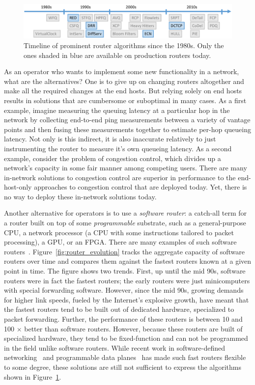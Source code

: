 \begin{figure}
\centering
\includegraphics[width=\columnwidth]{router_alg_timeline.pdf}
\caption{Timeline of prominent router algorithms since the 1980s. Only the ones shaded in blue are available on production routers today.}
\label{fig:router_algos}
\end{figure}

As an operator who wants to implement some new functionality in a network, what
are the alternatives? One is to give up on changing routers altogether and make
all the required changes at the end hosts. But relying solely on end hosts
results in solutions that are cumbersome or suboptimal in many cases. As a
first example, imagine measuring the queuing latency at a particular hop in the
network by collecting end-to-end ping measurements between a variety of vantage
points and then fusing these measurements together to estimate per-hop queueing
latency. Not only is this indirect, it is also inaccurate relatively to just
instrumenting the router to measure it's own queueing latency. As a second
example, consider the problem of congestion control, which divides up a
network's capacity in some fair manner among competing users. There are many
in-network solutions to congestion control are superior in performance to the
end-host-only approaches to congestion control that are deployed today. Yet,
there is no way to deploy these in-network solutions today.

Another alternative for operators is to use a \textit{software router}: a
catch-all term for a router built on top of some \textit{programmable}
substrate, such as a general-purpose CPU, a network processor (a CPU with some
instructions tailored to packet processing), a GPU, or an FPGA. There are many
examples of such software routers~\cite{click, routebrucks, netfpga,
packetshader, ixp}. Figure~\ref{fig:router_evolution} tracks the aggregate
capacity of software routers over time and compares them against the fastest
routers known at a given point in time. The figure shows two trends. First, up
until the mid 90s, software routers were in fact the fastest routers; the early
routers were just minicomputers with special forwarding software. However,
since the mid 90s, growing demands for higher link speeds, fueled by the
Internet's explosive growth, have meant that the fastest routers tend to be
built out of dedicated hardware, specialized to packet forwarding. Further, the
performance of these routers is between 10 and 100 $\times$ better than
software routers. However, because these routers are built of specialized
hardware, they tend to be fixed-function and can not be programmed in the field
unlike software routers. While recent work in software-defined
networking~\cite{openflow} and programmable data planes~\cite{rmt, flexpipe,
xpliant, tofino} has made such fast routers flexible to some degree, these
solutions are still not sufficient to express the algorithms shown in
Figure~\ref{fig:router_algos}.

